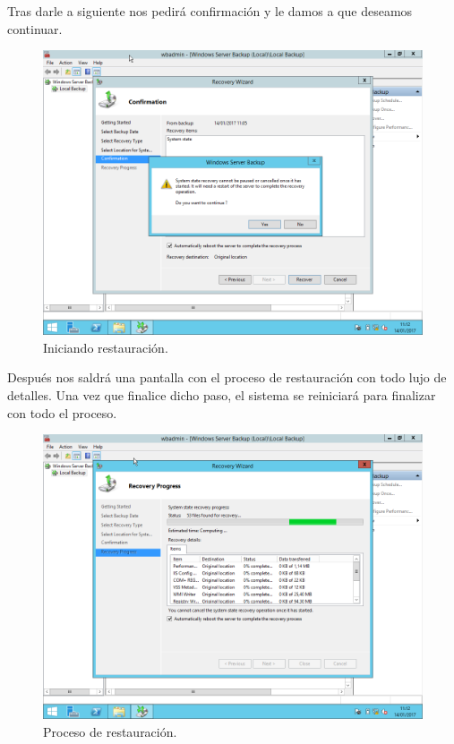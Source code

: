 \newpage
Tras darle a siguiente nos pedirá confirmación y le damos a que deseamos continuar.
\begin{figure}[H]
	\begin{center}
		\includegraphics[width=15cm]{Imagenes/Inicio_restauracion}
		\caption{Iniciando restauración.}
		\label{fig:18}
	\end{center}
\end{figure}

\newpage
Después nos saldrá una pantalla con el proceso de restauración con todo lujo de detalles. Una vez que finalice dicho paso, el sistema se reiniciará para finalizar con todo el proceso.
\begin{figure}[H]
	\begin{center}
		\includegraphics[width=15cm]{Imagenes/Estado_restauracion}
		\caption{Proceso de restauración.}
		\label{fig:19}
	\end{center}
\end{figure}

